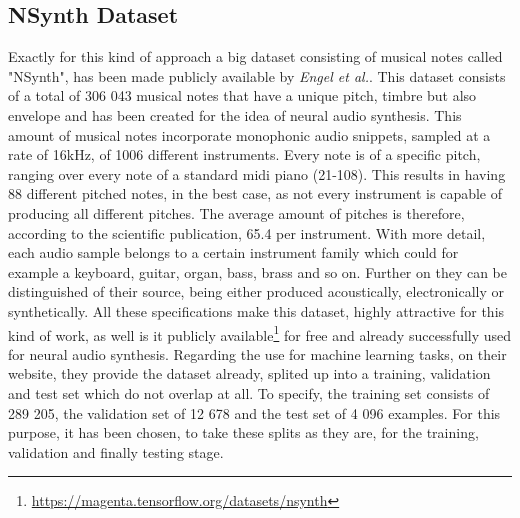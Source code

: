 \subsection{NSynth Dataset}
Exactly for this kind of approach a big dataset consisting of musical notes called "NSynth", has been made publicly available by \textit{Engel et al.}. \cite{Engel2017} This dataset consists of a total of 306 043 musical notes that have a unique pitch, timbre but also envelope and has been created for the idea of neural audio synthesis. This amount of musical notes incorporate monophonic audio snippets, sampled at a rate of 16kHz, of 1006 different instruments. Every note is of a specific pitch, ranging over every note of a standard midi piano (21-108). This results in having 88 different pitched notes, in the best case, as not every instrument is capable of producing all different pitches. The average amount of pitches is therefore, according to the scientific publication, 65.4 per instrument. With more detail, each audio sample belongs to a certain instrument family which could for example a keyboard, guitar, organ, bass, brass and so on. Further on they can be distinguished of their source, being either produced acoustically, electronically or synthetically. All these specifications make this dataset, highly attractive for this kind of work, as well is it publicly available\footnote{\url{https://magenta.tensorflow.org/datasets/nsynth}} for free and already successfully used for neural audio synthesis. Regarding the use for machine learning tasks, on their website, they provide the dataset already, splited up into a training, validation and test set which do not overlap at all. To specify, the training set consists of 289 205, the validation set of 12 678 and the test set of 4 096 examples. For this purpose, it has been chosen, to take these splits as they are, for the training, validation and finally testing stage.